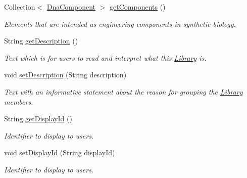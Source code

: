\begin{DoxyCompactItemize}
\item 
Collection$<$ \hyperlink{classorg_1_1sbolstandard_1_1lib_s_b_o_lj_1_1_dna_component}{DnaComponent} $>$ \hyperlink{classorg_1_1sbolstandard_1_1lib_s_b_o_lj_1_1_library_a45382b83b645ea4b89393c96023c54ba}{getComponents} ()
\begin{DoxyCompactList}\small\item\em Elements that are intended as engineering components in synthetic biology. \item\end{DoxyCompactList}\item 
String \hyperlink{classorg_1_1sbolstandard_1_1lib_s_b_o_lj_1_1_library_ac7feffb7a33f63504ff1f87f19e2d2d8}{getDescription} ()
\begin{DoxyCompactList}\small\item\em Text which is for users to read and interpret what this \hyperlink{classorg_1_1sbolstandard_1_1lib_s_b_o_lj_1_1_library}{Library} is. \item\end{DoxyCompactList}\item 
void \hyperlink{classorg_1_1sbolstandard_1_1lib_s_b_o_lj_1_1_library_a1d15d718177c4f5411ce6ab339889fd4}{setDescription} (String description)
\begin{DoxyCompactList}\small\item\em Text with an informative statement about the reason for grouping the \hyperlink{classorg_1_1sbolstandard_1_1lib_s_b_o_lj_1_1_library}{Library} members. \item\end{DoxyCompactList}\item 
String \hyperlink{classorg_1_1sbolstandard_1_1lib_s_b_o_lj_1_1_library_aefe76199cb4d0096f487b280c411d843}{getDisplayId} ()
\begin{DoxyCompactList}\small\item\em Identifier to display to users. \item\end{DoxyCompactList}\item 
void \hyperlink{classorg_1_1sbolstandard_1_1lib_s_b_o_lj_1_1_library_a46b93a70e7bd612a7b429aac4829bc88}{setDisplayId} (String displayId)
\begin{DoxyCompactList}\small\item\em Identifier to display to users. \item\end{DoxyCompactList}\item 

\end{DoxyCompactItemize}
